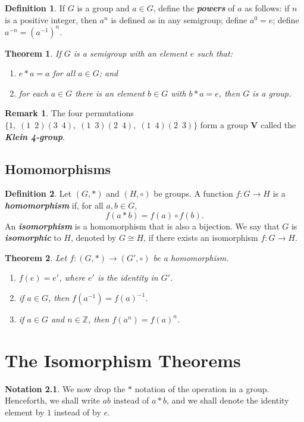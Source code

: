 \documentclass[12pt]{report}
\newtheorem{theorem}{Theorem}[chapter]
\theoremstyle{definition}
\newtheorem*{definition}{Definition}
\newtheorem*{notation}{Notation}
\newtheorem*{remark}{Remark}
\newcommand{\term}[1]{\textbf{\textit{#1}}}
\begin{document}
\begin{definition}
	If $G$ is a group and $a\in G$, define the \term{powers} of $a$ as follows: if $n$ is a positive integer, then $a^n$ is defined as in any semigroup; define $a^0=e$; define $a^{-n}=(a^{-1})^n$.
\end{definition}

\begin{theorem}
	If $G$ is a semigroup with an element $e$ such that:
	\begin{enumerate}
		\item $e\ast a=a$ for all $a\in G$; and
		\item for each $a\in G$ there is an element $b\in G$ with $b\ast a=e$, then $G$ is a group.
	\end{enumerate}
\end{theorem}

\begin{remark}
	The four permutations $\{1,\;(1\enspace2)(3\enspace4),\;(1\enspace3)(2\enspace4),\;(1\enspace4)(2\enspace3) \}$
	form a group $\mathbf{V}$ called the \term{Klein 4-group}.
\end{remark}

\section{Homomorphisms}
\begin{definition}
	Let $(G,\ast)$ and $(H,\circ)$ be groups. A function $f:G\to H$ is a \term{homomorphism} if, for all $a,b\in G$, \[f(a\ast b)=f(a)\circ f(b).\]
	An \term{isomorphism} is a homomorphism that is also a bijection. We say that $G$ is \term{isomorphic} to $H$, denoted by $G\cong H$, if there exists an isomorphism $f:G\to H$.
\end{definition}

\begin{theorem}
	Let $f:(G,\ast)\to(G',\circ)$ be a homomorphism.
	\begin{enumerate}
		\item $f(e)=e'$, where $e'$ is the identity in $G'$.
		\item if $a\in G$, then $f(a^{-1})=f(a)^{-1}$.
		\item if $a\in G$ and $n\in\mathbb{Z}$, then $f(a^n)=f(a)^n$.
	\end{enumerate}
\end{theorem}



\chapter{The Isomorphism Theorems}
\begin{notation}
	We now drop the $\ast$ notation of the operation in a group. Henceforth, we shall write $ab$ instead of $a\ast b$, and we shall denote the identity element by $1$ instead of by $e$.
\end{notation}
\end{document}
